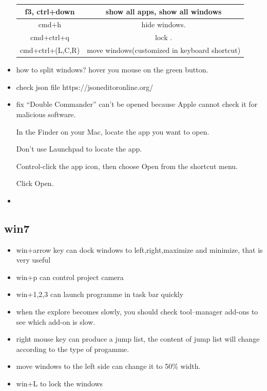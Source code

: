 \documentclass[a4paper,11pt,twoside]{book}
\begin{document}
\begin{itemize}
\begin{tabular}{|c|c|}
  	f3, ctrl+down & show all apps, show all windows  \\
  	\hline
  	cmd+h & hide windows.  \\
  	\hline
  	cmd+ctrl+q  & lock .  \\
  	\hline	
  	cmd+ctrl+(L,C,R)  & move windows(customized in keyboard shortcut)  \\
  	\hline
  \end{tabular}
  
  \item how to split windows? hover you mouse on the green button. 
  
  \item check json file 
  https://jsoneditoronline.org/
  
  \item fix “Double Commander” can’t be opened because Apple cannot check it for malicious software.
  
  In the Finder  on your Mac, locate the app you want to open.
  
  Don’t use Launchpad to locate the app.
  
  Control-click the app icon, then choose Open from the shortcut menu.
  
  Click Open.
  
  \item 
  
\end{itemize}

\subsection{win7}

\begin{itemize}
\item win+arrow key can dock windows to left,right,maximize and minimize, that is very useful
\item win+p can control project camera
\item win+1,2,3 can launch programme in task bar quickly
\item when the explore becomes slowly, you should check tool--manager add-ons to see which add-on is slow.
\item right mouse key can produce a jump list, the content of jump list will change according to the type of progamme.
\item move windows to the left side can change it to 50\% width.
\item win+L to lock the windows
\end{itemize}
\end{document}
